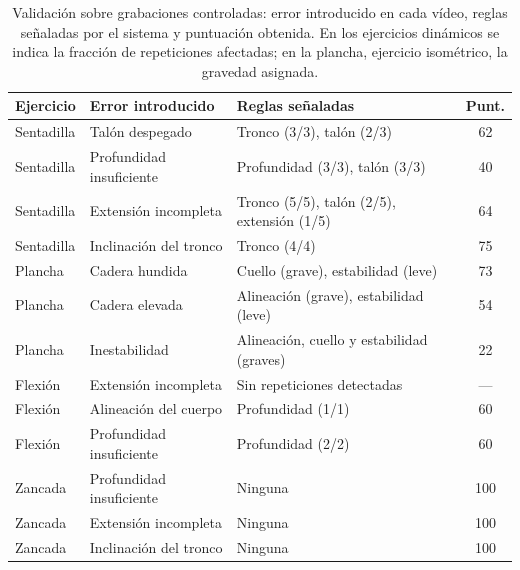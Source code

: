 \documentclass[12pt,a4paper,twoside,openright]{book}
\begin{document}
    \begin{table}[htbp]
        \centering
        \small
        \begin{tabular}{p{1.9cm} p{3.1cm} p{4.7cm} c}
            \toprule
            \textbf{Ejercicio} & \textbf{Error introducido} & \textbf{Reglas señaladas} & \textbf{Punt.} \\
            \midrule
            Sentadilla & Talón despegado          & Tronco (3/3), talón (2/3)                  & 62 \\
            Sentadilla & Profundidad insuficiente & Profundidad (3/3), talón (3/3)             & 40 \\
            Sentadilla & Extensión incompleta     & Tronco (5/5), talón (2/5), extensión (1/5) & 64 \\
            Sentadilla & Inclinación del tronco   & Tronco (4/4)                               & 75 \\
            \midrule
            Plancha    & Cadera hundida           & Cuello (grave), estabilidad (leve)         & 73 \\
            Plancha    & Cadera elevada           & Alineación (grave), estabilidad (leve)     & 54 \\
            Plancha    & Inestabilidad            & Alineación, cuello y estabilidad (graves)  & 22 \\
            \midrule
            Flexión    & Extensión incompleta     & Sin repeticiones detectadas                & --- \\
            Flexión    & Alineación del cuerpo    & Profundidad (1/1)                          & 60 \\
            Flexión    & Profundidad insuficiente & Profundidad (2/2)                          & 60 \\
            \midrule
            Zancada    & Profundidad insuficiente & Ninguna                                    & 100 \\
            Zancada    & Extensión incompleta     & Ninguna                                    & 100 \\
            Zancada    & Inclinación del tronco   & Ninguna                                    & 100 \\
            \bottomrule
        \end{tabular}
        \caption{Validación sobre grabaciones controladas: error introducido en
        cada vídeo, reglas señaladas por el sistema y puntuación obtenida. En los
        ejercicios dinámicos se indica la fracción de repeticiones afectadas; en
        la plancha, ejercicio isométrico, la gravedad asignada.}
        \label{tab:validacion-videos}
    \end{table}
\end{document}
